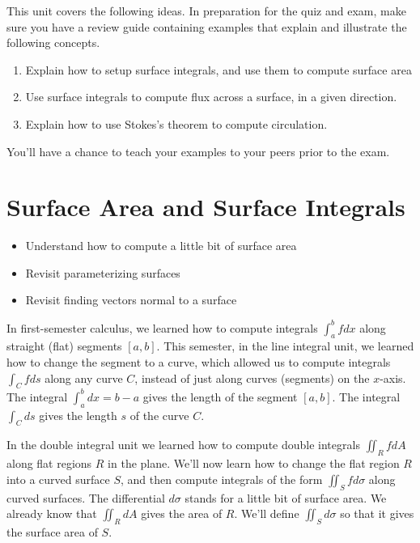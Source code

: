 
\noindent 
This unit covers the following ideas. In preparation for the quiz and exam, make sure you have a review guide containing examples that explain and illustrate the following concepts.  
\begin{enumerate}
\item Explain how to setup surface integrals, and use them to compute surface area
\item Use surface integrals to compute flux across a surface, in a given direction. 
\item Explain how to use Stokes's theorem to compute circulation. 
\end{enumerate}
You'll have a chance to teach your examples to your peers prior to the exam.

\uday
\normalsize
\section{Surface Area and Surface Integrals}
\begin{itemize}
\item Understand how to compute a little bit of surface area
\item Revisit parameterizing surfaces
\item Revisit finding vectors normal to a surface
\end{itemize}



In first-semester calculus, we learned how to compute integrals $\int_a^b f dx$ along straight (flat) segments $[a,b]$. This semester, in the line integral unit, we learned how to change the segment to a curve, which allowed us to compute integrals $\int_C fds$ along any curve $C$, instead of just along curves (segments) on the $x$-axis. The integral $\int_a^b dx=b-a$ gives the length of the segment $[a,b]$. The integral $\int_C ds$ gives the length $s$ of the curve $C$.  

In the double integral unit we learned how to compute double integrals $\iint_R fdA$ along flat regions $R$ in the plane. We'll now learn how to change the flat region $R$ into a curved surface $S$, and then compute integrals of the form $\iint_S fd\sigma$ along curved surfaces. The differential $d\sigma$ stands for a little bit of surface area.  We already know that $\iint_R dA$ gives the area of $R$.  We'll define $\iint_S d\sigma$ so that it gives the surface area of $S$.


